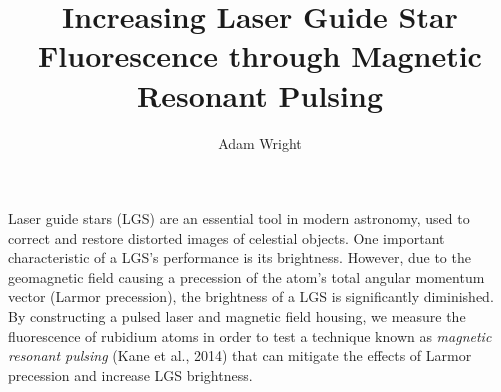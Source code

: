 \documentclass[]{article}
\title{Increasing Laser Guide Star Fluorescence through Magnetic Resonant Pulsing}
\author{Adam Wright}
\begin{document}
\maketitle

Laser guide stars (LGS) are an essential tool in modern astronomy, used to correct and restore distorted images of celestial objects. One important characteristic of a LGS's performance is its brightness. However, due to the geomagnetic field causing a precession of the atom's total angular momentum vector (Larmor precession), the brightness of a LGS is significantly diminished. By constructing a pulsed laser and magnetic field housing, we measure the fluorescence of rubidium atoms in order to test a technique known as \textit{magnetic resonant pulsing} (Kane et al., 2014) that can mitigate the effects of Larmor precession and increase LGS brightness.
\end{document}
